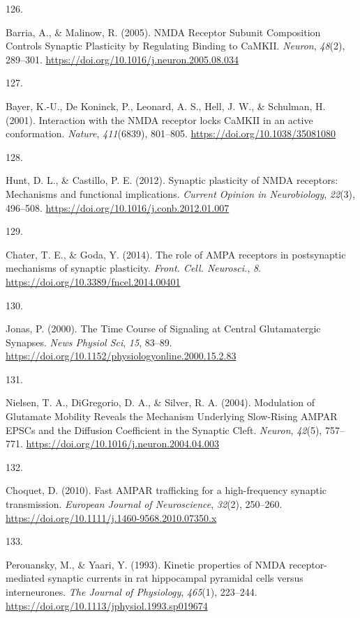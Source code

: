 \documentclass[
  11pt,
  letterpaper,
]{scrreprt}
\newlength{\cslhangindent}
\newlength{\csllabelwidth}
\newenvironment{CSLReferences}[2] %
 {\begin{list}{}{%
  \setlength{\itemindent}{0pt}
  \setlength{\leftmargin}{0pt}
  \setlength{\parsep}{0pt}
  \ifodd #1
   \setlength{\leftmargin}{\cslhangindent}
   \setlength{\itemindent}{-1\cslhangindent}
  \fi
  \setlength{\itemsep}{#2\baselineskip}}}
 {\end{list}}
\newcommand{\CSLLeftMargin}[1]{\parbox[t]{\csllabelwidth}{\strut#1\strut}}
\newcommand{\CSLRightInline}[1]{\parbox[t]{\linewidth - \csllabelwidth}{\strut#1\strut}}
\begin{document}
\begin{CSLReferences}{0}{0}
\CSLLeftMargin{126. }%
\CSLRightInline{Barria, A., \& Malinow, R. (2005). {NMDA Receptor
Subunit Composition Controls Synaptic Plasticity} by {Regulating
Binding} to {CaMKII}. \emph{Neuron}, \emph{48}(2), 289--301.
\url{https://doi.org/10.1016/j.neuron.2005.08.034}}

\CSLLeftMargin{127. }%
\CSLRightInline{Bayer, K.-U., De Koninck, P., Leonard, A. S., Hell, J.
W., \& Schulman, H. (2001). Interaction with the {NMDA} receptor locks
{CaMKII} in an active conformation. \emph{Nature}, \emph{411}(6839),
801--805. \url{https://doi.org/10.1038/35081080}}

\CSLLeftMargin{128. }%
\CSLRightInline{Hunt, D. L., \& Castillo, P. E. (2012). Synaptic
plasticity of {NMDA} receptors: Mechanisms and functional implications.
\emph{Current Opinion in Neurobiology}, \emph{22}(3), 496--508.
\url{https://doi.org/10.1016/j.conb.2012.01.007}}

\CSLLeftMargin{129. }%
\CSLRightInline{Chater, T. E., \& Goda, Y. (2014). The role of {AMPA}
receptors in postsynaptic mechanisms of synaptic plasticity.
\emph{Front. Cell. Neurosci.}, \emph{8}.
\url{https://doi.org/10.3389/fncel.2014.00401}}

\CSLLeftMargin{130. }%
\CSLRightInline{Jonas, P. (2000). The {Time Course} of {Signaling} at
{Central Glutamatergic Synapses}. \emph{News Physiol Sci}, \emph{15},
83--89. \url{https://doi.org/10.1152/physiologyonline.2000.15.2.83}}

\CSLLeftMargin{131. }%
\CSLRightInline{Nielsen, T. A., DiGregorio, D. A., \& Silver, R. A.
(2004). Modulation of {Glutamate Mobility Reveals} the {Mechanism
Underlying Slow-Rising AMPAR EPSCs} and the {Diffusion Coefficient} in
the {Synaptic Cleft}. \emph{Neuron}, \emph{42}(5), 757--771.
\url{https://doi.org/10.1016/j.neuron.2004.04.003}}

\CSLLeftMargin{132. }%
\CSLRightInline{Choquet, D. (2010). Fast {AMPAR} trafficking for a
high-frequency synaptic transmission. \emph{European Journal of
Neuroscience}, \emph{32}(2), 250--260.
\url{https://doi.org/10.1111/j.1460-9568.2010.07350.x}}

\CSLLeftMargin{133. }%
\CSLRightInline{Perouansky, M., \& Yaari, Y. (1993). Kinetic properties
of {NMDA} receptor-mediated synaptic currents in rat hippocampal
pyramidal cells versus interneurones. \emph{The Journal of Physiology},
\emph{465}(1), 223--244.
\url{https://doi.org/10.1113/jphysiol.1993.sp019674}}


\end{CSLReferences}
\end{document}
